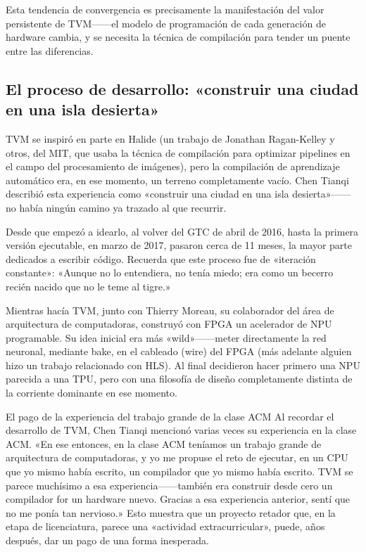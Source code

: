 Esta tendencia de convergencia es precisamente la manifestación del valor persistente de TVM------el modelo de programación de cada generación de hardware cambia, y se necesita la técnica de compilación para tender un puente entre las diferencias.

\subsection{El proceso de desarrollo: «construir una ciudad en una isla desierta»}

TVM se inspiró en parte en Halide (un trabajo de Jonathan Ragan-Kelley y otros, del MIT, que usaba la técnica de compilación para optimizar pipelines en el campo del procesamiento de imágenes), pero la compilación de aprendizaje automático era, en ese momento, un terreno completamente vacío. Chen Tianqi describió esta experiencia como «construir una ciudad en una isla desierta»------no había ningún camino ya trazado al que recurrir.

Desde que empezó a idearlo, al volver del GTC de abril de 2016, hasta la primera versión ejecutable, en marzo de 2017, pasaron cerca de 11 meses, la mayor parte dedicados a escribir código. Recuerda que este proceso fue de «iteración constante»: «Aunque no lo entendiera, no tenía miedo; era como un becerro recién nacido que no le teme al tigre.»

Mientras hacía TVM, junto con Thierry Moreau, su colaborador del área de arquitectura de computadoras, construyó con FPGA un acelerador de NPU programable. Su idea inicial era más «wild»------meter directamente la red neuronal, mediante bake, en el cableado (wire) del FPGA (más adelante alguien hizo un trabajo relacionado con HLS). Al final decidieron hacer primero una NPU parecida a una TPU, pero con una filosofía de diseño completamente distinta de la corriente dominante en ese momento.

\begin{warningbox}{El pago de la experiencia del trabajo grande de la clase ACM}
Al recordar el desarrollo de TVM, Chen Tianqi mencionó varias veces su experiencia en la clase ACM. «En ese entonces, en la clase ACM teníamos un trabajo grande de arquitectura de computadoras, y yo me propuse el reto de ejecutar, en un CPU que yo mismo había escrito, un compilador que yo mismo había escrito. TVM se parece muchísimo a esa experiencia------también era construir desde cero un compilador for un hardware nuevo. Gracias a esa experiencia anterior, sentí que no me ponía tan nervioso.» Esto muestra que un proyecto retador que, en la etapa de licenciatura, parece una «actividad extracurricular», puede, años después, dar un pago de una forma inesperada.
\end{warningbox}

